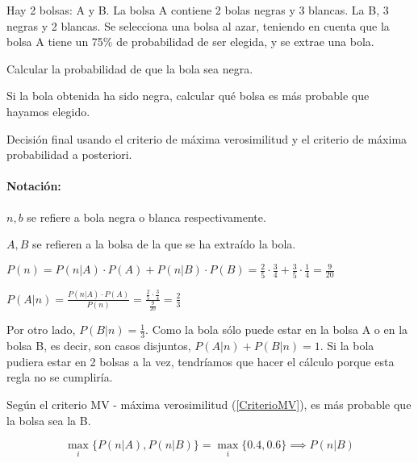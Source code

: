 \begin{problem}[5]
Hay 2 bolsas: A y B. La bolsa A contiene 2 bolas negras y 3 blancas. La B, 3 negras y 2 blancas. Se selecciona una bolsa al azar, teniendo en cuenta que la bolsa A tiene un 75\% de probabilidad de ser elegida, y se extrae una bola.

\ppart Calcular la probabilidad de que la bola sea negra.

\ppart Si la bola obtenida ha sido negra, calcular qué bolsa es más probable que hayamos elegido.

\ppart Decisión final usando el criterio de máxima verosimilitud y el criterio de máxima probabilidad a posteriori.


\solution
\paragraph{Notación:\\} 
$n,b$ se refiere a bola negra o blanca respectivamente.

$A,B$ se refieren a la bolsa de la que se ha extraído la bola.

\spart $P(n) = P(n | A)·P(A) + P(n|B)·P(B) = \frac{2}{5}·\frac{3}{4} + \frac{3}{5} · \frac{1}{4} = \frac{9}{20}$

\spart $P(A|n) = \frac{P(n|A)·P(A)}{P(n)} = \frac{\frac{2}{5}·\frac{3}{4}}{\frac{9}{20}} = \frac{2}{3}$

Por otro lado, $P(B|n) = \frac{1}{3}$. Como la bola sólo puede estar en la bolsa A o en la bolsa B, es decir, son casos disjuntos, $P(A|n) + P(B|n) = 1$. Si la bola pudiera estar en 2 bolsas a la vez, tendríamos que hacer el cálculo porque esta regla no se cumpliría.

\spart

Según el criterio MV - máxima verosimilitud (\ref{CriterioMV}), es más probable que la bolsa sea la B.

\[
\max_i\{P(n|A),P(n|B)\} = \max_i\{0.4,0.6\}\implies P(n|B)
\]

\end{problem}

